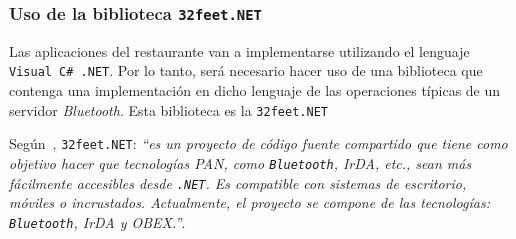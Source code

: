   \subsubsection{Uso de la biblioteca \texttt{32feet.NET}}
Las aplicaciones del restaurante van a implementarse utilizando el lenguaje
\texttt{Visual C\# .NET}. Por lo tanto, será necesario hacer uso de una 
biblioteca que contenga una implementación en dicho lenguaje de las 
operaciones típicas de un servidor \emph{Bluetooth}. Esta biblioteca es la
\texttt{32feet.NET}

Según~\cite{bib:32feet}, \texttt{32feet.NET}: \emph{``es un proyecto de código 
fuente compartido que tiene como objetivo hacer que tecnologías \acs{PAN}, como 
\texttt{Bluetooth}, \acs{IrDA}, etc., sean más fácilmente accesibles desde 
\texttt{.NET}. Es compatible con sistemas de escritorio, móviles o incrustados.
Actualmente, el proyecto se compone de las tecnologías: \texttt{Bluetooth},
\acs{IrDA} y \acs{OBEX}.''}.

